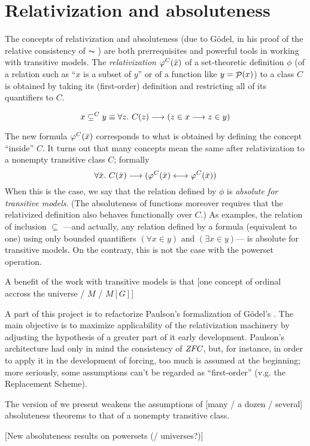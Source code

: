 \section{Relativization and absoluteness}

The concepts of relativization and absoluteness (due to Gödel, in his
proof of the relative consistency of $\AC$ \cite{godel-L}) 
are both
prerrequisites and powerful tools in working with transitive
models. The \emph{relativization} $\phi^C(\bx)$ of a set-theoretic
definition
$\phi$ (of a relation such
as ``$x$ is a subset of $y$'' or of a function like $y=\P(x)$) to
a class $C$ is obtained by taking its (first-order) definition and
restricting all of its quantifiers to $C$.

\[
x \sbq^C y \equiv \forall z.\ C(z) \longrightarrow (z\in x
\longrightarrow z\in y)
\]

The new formula $\phi^C(\bx)$ corresponds to what is obtained by defining
the concept ``inside'' $C$. It turns out that many concepts mean the
same after relativization to a nonempty transitive class $C$; formally
\[
\forall\bx.\ C(\bx) \longrightarrow (\phi^C(\bx) \longleftrightarrow
\phi^C(\bx))
\]
When this is the case, we say that the relation defined by $\phi$ is
\emph{absolute for transitive models}. (The absoluteness of functions
moreover requires that
the relativized definition also behaves functionally over $C$.) As
examples, the relation of inclusion $\subseteq$ ---and actually, any
relation defined by a formula (equivalent to one) using only bounded
quantifiers 
$(\forall x\in y)$ and $(\exists x\in y)$--- is absolute for
transitive models. On the contrary, this is not the case with the powerset
operation.

A benefit of the work with transitive models is that [one concept of
  ordinal accross the universe / $M$ / $M[G]$]

A part of this project is to refactorize Paulson's formalization
\cite{paulson_2003} of Gödel's \cite{godel-L}. The main objective is
to maximize applicability of the relativization machinery by adjusting
the hypothesis of a greater part of it early development. Paulson's
architecture had only in mind the consistency of $\ZFC$, but, for
instance, in order to apply it in the development of forcing, too much
is assumed at the beginning; more seriously, some assumptions can't be
regarded as ``first-order'' (v.g. the Replacement Scheme).

The version of  we present weakens the
assumptions of [many / a dozen / several] absoluteness theorems to that
of a nonempty transitive class.

[New absoluteness results on powersets (/ universes?)]

